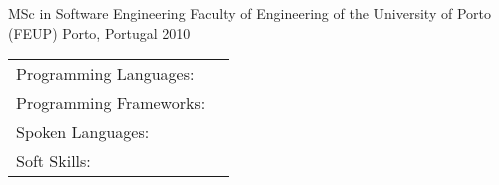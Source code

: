 \documentclass[]{awesome-cv}
\begin{document}
\vspace{-5mm}
\begin{cventries}
	\cventry
	{MSc in Software Engineering}
	{Faculty of Engineering of the University of Porto (FEUP)}
	{Porto, Portugal}
	{2010}
	{}
\end{cventries}

\vspace{-6mm}
\begin{cventries}
	\vspace{-2mm}
	\cventry
	{}
	{\def\arraystretch{1.15}{\begin{tabular}{ l l }
		Programming Languages:  & {\skill{ Kotlin, Java, JavaScript, Perl, SQL, PHP, C++}} \\
		Programming Frameworks:  & {\skill{ Android, ionic, jQuery, Laravel, Vue.js, Quasar, Play Framework}} \\
		Spoken Languages:  & {\skill{ English, Portuguese, French, Spanish, Slovene}} \\
		Soft Skills:  & {\skill{ Ability to Work Under Pressure, Self-motivation, Creativity, Good communication}} \\
		\end{tabular}}}
	{}
	{}
	{}
\end{cventries}
\end{document}
